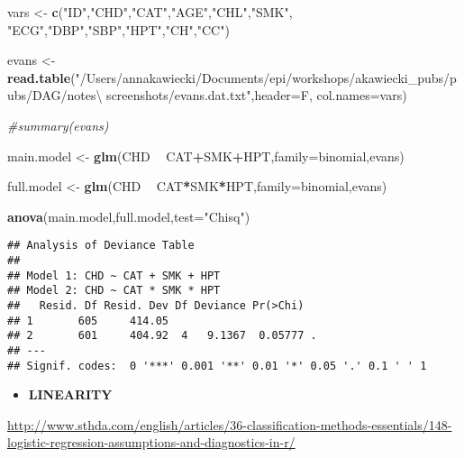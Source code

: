 \documentclass[
]{article}
\newenvironment{Shaded}{\begin{snugshade}}{\end{snugshade}}
\newcommand{\CommentTok}[1]{\textcolor[rgb]{0.56,0.35,0.01}{\textit{#1}}}
\newcommand{\DataTypeTok}[1]{\textcolor[rgb]{0.13,0.29,0.53}{#1}}
\newcommand{\KeywordTok}[1]{\textcolor[rgb]{0.13,0.29,0.53}{\textbf{#1}}}
\newcommand{\NormalTok}[1]{#1}
\newcommand{\OperatorTok}[1]{\textcolor[rgb]{0.81,0.36,0.00}{\textbf{#1}}}
\newcommand{\StringTok}[1]{\textcolor[rgb]{0.31,0.60,0.02}{#1}}
\providecommand{\tightlist}{%
  \setlength{\itemsep}{0pt}\setlength{\parskip}{0pt}}
\begin{document}
\begin{Shaded}
\begin{Highlighting}[]
\NormalTok{vars <-}\StringTok{ }\KeywordTok{c}\NormalTok{(}\StringTok{"ID"}\NormalTok{,}\StringTok{"CHD"}\NormalTok{,}\StringTok{"CAT"}\NormalTok{,}\StringTok{"AGE"}\NormalTok{,}\StringTok{"CHL"}\NormalTok{,}\StringTok{"SMK"}\NormalTok{, }\StringTok{"ECG"}\NormalTok{,}\StringTok{"DBP"}\NormalTok{,}\StringTok{"SBP"}\NormalTok{,}\StringTok{"HPT"}\NormalTok{,}\StringTok{"CH"}\NormalTok{,}\StringTok{"CC"}\NormalTok{)}

\NormalTok{evans <-}\StringTok{ }\KeywordTok{read.table}\NormalTok{(}\StringTok{"/Users/annakawiecki/Documents/epi/workshops/akawiecki_pubs/pubs/DAG/notes\textbackslash{} screenshots/evans.dat.txt"}\NormalTok{,}\DataTypeTok{header=}\NormalTok{F, }\DataTypeTok{col.names=}\NormalTok{vars)}

\CommentTok{#summary(evans)}

\NormalTok{main.model <-}\StringTok{ }\KeywordTok{glm}\NormalTok{(CHD }\OperatorTok{~}\StringTok{ }\NormalTok{CAT}\OperatorTok{+}\NormalTok{SMK}\OperatorTok{+}\NormalTok{HPT,}\DataTypeTok{family=}\NormalTok{binomial,evans) }

\NormalTok{full.model <-}\StringTok{ }\KeywordTok{glm}\NormalTok{(CHD }\OperatorTok{~}\StringTok{ }\NormalTok{CAT}\OperatorTok{*}\NormalTok{SMK}\OperatorTok{*}\NormalTok{HPT,}\DataTypeTok{family=}\NormalTok{binomial,evans)}

\KeywordTok{anova}\NormalTok{(main.model,full.model,}\DataTypeTok{test=}\StringTok{"Chisq"}\NormalTok{)}
\end{Highlighting}
\end{Shaded}

\begin{verbatim}
## Analysis of Deviance Table
## 
## Model 1: CHD ~ CAT + SMK + HPT
## Model 2: CHD ~ CAT * SMK * HPT
##   Resid. Df Resid. Dev Df Deviance Pr(>Chi)  
## 1       605     414.05                       
## 2       601     404.92  4   9.1367  0.05777 .
## ---
## Signif. codes:  0 '***' 0.001 '**' 0.01 '*' 0.05 '.' 0.1 ' ' 1
\end{verbatim}

\begin{itemize}
\tightlist
\item
  \textbf{LINEARITY}
\end{itemize}

\url{http://www.sthda.com/english/articles/36-classification-methods-essentials/148-logistic-regression-assumptions-and-diagnostics-in-r/}
\end{document}
